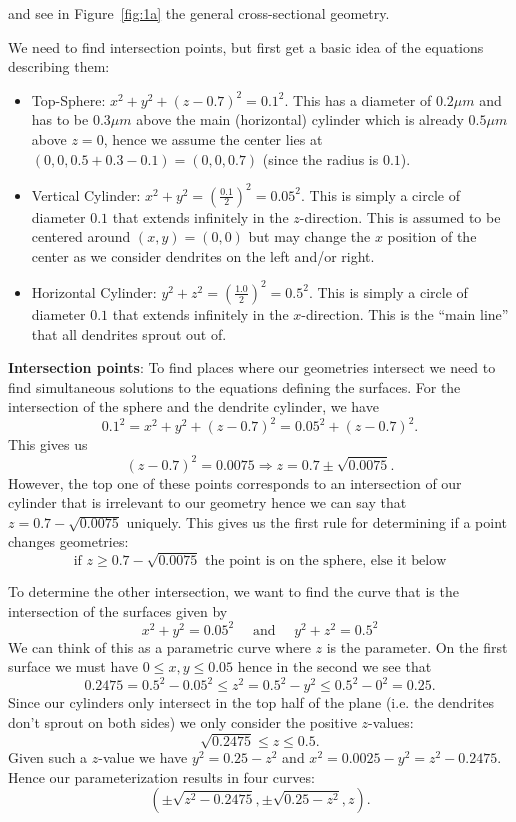 \documentclass[a4paper,10pt]{article}
\begin{document}
and see in Figure~\ref{fig:1a} the general cross-sectional geometry.

We need to find intersection points, but first get a basic idea of
the equations describing them:
\begin{itemize}
\item Top-Sphere: \(x^2 + y^2 + \left(z - 0.7\right)^2 = 0.1^2\). This has
a diameter of \(0.2 \mu m\) and has to be \(0.3 \mu m\) above the main
(horizontal) cylinder which is already \(0.5 \mu m\) above \(z = 0\), hence
we assume the center lies at \((0, 0, 0.5 + 0.3 - 0.1)
= (0, 0, 0.7)\) (since the radius is \(0.1\)).
\item Vertical Cylinder: \(x^2 + y^2 = \left(\frac{0.1}{2}\right)^2 =
0.05^2\). This is simply a circle of diameter \(0.1\) that extends infinitely
in the \(z\)-direction. This is assumed to be centered around \((x, y)
= (0, 0)\) but may change the \(x\) position of the center as we consider
dendrites on the left and/or right.
\item Horizontal Cylinder: \(y^2 + z^2 = \left(\frac{1.0}{2}\right)^2 =
0.5^2\). This is simply a circle of diameter \(0.1\) that extends infinitely
in the \(x\)-direction. This is the ``main line'' that all dendrites
sprout out of.
\end{itemize}

\textbf{Intersection points}: To find places where our geometries intersect
we need to find simultaneous solutions to the equations defining the
surfaces. For the intersection of the sphere and the dendrite cylinder,
we have
\[0.1^2 = x^2 + y^2 + \left(z - 0.7\right)^2 = 0.05^2 + \left(z -
0.7\right)^2.\]
This gives us
\[\left(z - 0.7\right)^2 = 0.0075 \Rightarrow z = 0.7 \pm \sqrt{0.0075}.\]
However, the top one of these points corresponds to an intersection of our
cylinder that is irrelevant to our geometry hence we can say that \(z =
0.7 - \sqrt{0.0075}\) uniquely. This gives us the first rule for determining
if a point changes geometries:
\[\boxed{\text{if } z \geq 0.7 - \sqrt{0.0075} \text{ the point is on the
sphere, else it below}}\]

To determine the other intersection, we want to find the curve that is
the intersection of the surfaces given by
\[x^2 + y^2 = 0.05^2 \quad \text{ and } \quad y^2 + z^2 = 0.5^2\]
We can think of this as a parametric curve where \(z\) is the parameter.
On the first surface we must have \(0 \leq x, y \leq 0.05\) hence in the
second we see that
\[0.2475 = 0.5^2 - 0.05^2 \leq z^2 = 0.5^2 - y^2 \leq 0.5^2 - 0^2 = 0.25.\]
Since our cylinders only intersect in the top half of the plane (i.e. the
dendrites don't sprout on both sides) we only consider the positive
\(z\)-values:
\[\sqrt{0.2475} \leq z \leq 0.5.\]
Given such a \(z\)-value we have \(y^2 = 0.25 - z^2\) and \(x^2 = 0.0025 -
y^2 = z^2 - 0.2475\). Hence our parameterization results in four curves:
\[\left(\pm \sqrt{z^2 - 0.2475}, \pm \sqrt{0.25 - z^2}, z\right).\]
\end{document}

